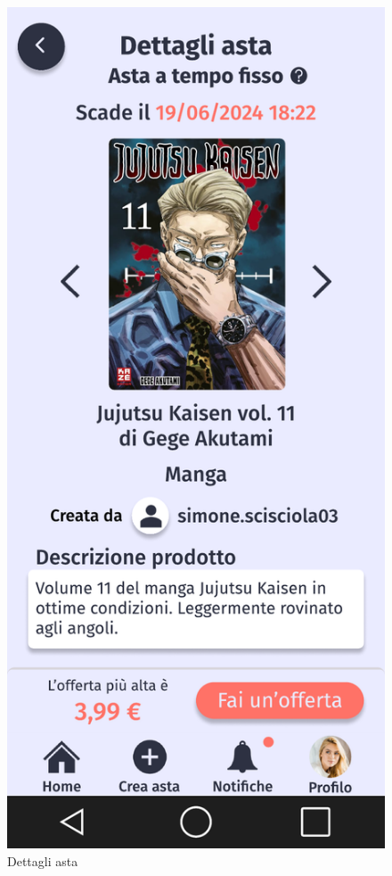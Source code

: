     \begin{figure}[!htb]
        \begin{minipage}{0.32\textwidth}
            \centering
            \includegraphics[width=.7\linewidth]{Immagini/Frames/Compratore/C7.pdf}
            \caption{Dettagli asta}
        \end{minipage}\hfill
        \begin{minipage}{0.32\textwidth}
            \centering

\end{minipage}
\end{figure}
